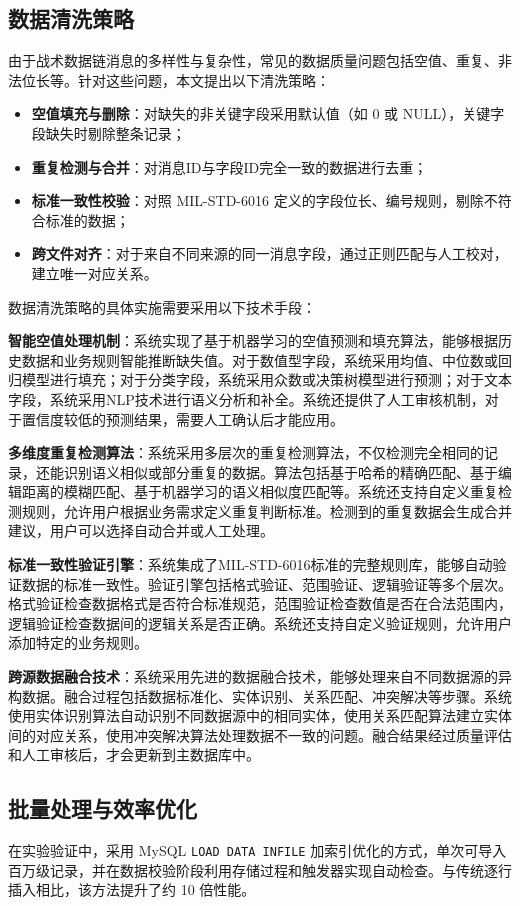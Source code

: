 \subsection{数据清洗策略}
由于战术数据链消息的多样性与复杂性，常见的数据质量问题包括空值、重复、非法位长等。针对这些问题，本文提出以下清洗策略：
\begin{itemize}
  \item \textbf{空值填充与删除}：对缺失的非关键字段采用默认值（如 0 或 NULL），关键字段缺失时剔除整条记录；
  \item \textbf{重复检测与合并}：对消息ID与字段ID完全一致的数据进行去重；
  \item \textbf{标准一致性校验}：对照 {MIL-STD-6016} 定义的字段位长、编号规则，剔除不符合标准的数据；
  \item \textbf{跨文件对齐}：对于来自不同来源的同一消息字段，通过正则匹配与人工校对，建立唯一对应关系。
\end{itemize}

数据清洗策略的具体实施需要采用以下技术手段：

\textbf{智能空值处理机制}：系统实现了基于机器学习的空值预测和填充算法，能够根据历史数据和业务规则智能推断缺失值。对于数值型字段，系统采用均值、中位数或回归模型进行填充；对于分类字段，系统采用众数或决策树模型进行预测；对于文本字段，系统采用NLP技术进行语义分析和补全。系统还提供了人工审核机制，对于置信度较低的预测结果，需要人工确认后才能应用。

\textbf{多维度重复检测算法}：系统采用多层次的重复检测算法，不仅检测完全相同的记录，还能识别语义相似或部分重复的数据。算法包括基于哈希的精确匹配、基于编辑距离的模糊匹配、基于机器学习的语义相似度匹配等。系统还支持自定义重复检测规则，允许用户根据业务需求定义重复判断标准。检测到的重复数据会生成合并建议，用户可以选择自动合并或人工处理。

\textbf{标准一致性验证引擎}：系统集成了MIL-STD-6016标准的完整规则库，能够自动验证数据的标准一致性。验证引擎包括格式验证、范围验证、逻辑验证等多个层次。格式验证检查数据格式是否符合标准规范，范围验证检查数值是否在合法范围内，逻辑验证检查数据间的逻辑关系是否正确。系统还支持自定义验证规则，允许用户添加特定的业务规则。

\textbf{跨源数据融合技术}：系统采用先进的数据融合技术，能够处理来自不同数据源的异构数据。融合过程包括数据标准化、实体识别、关系匹配、冲突解决等步骤。系统使用实体识别算法自动识别不同数据源中的相同实体，使用关系匹配算法建立实体间的对应关系，使用冲突解决算法处理数据不一致的问题。融合结果经过质量评估和人工审核后，才会更新到主数据库中。

\subsection{批量处理与效率优化}
在实验验证中，采用 MySQL \texttt{LOAD DATA INFILE} 加索引优化的方式，单次可导入百万级记录，并在数据校验阶段利用存储过程和触发器实现自动检查。与传统逐行插入相比，该方法提升了约 10 倍性能。

